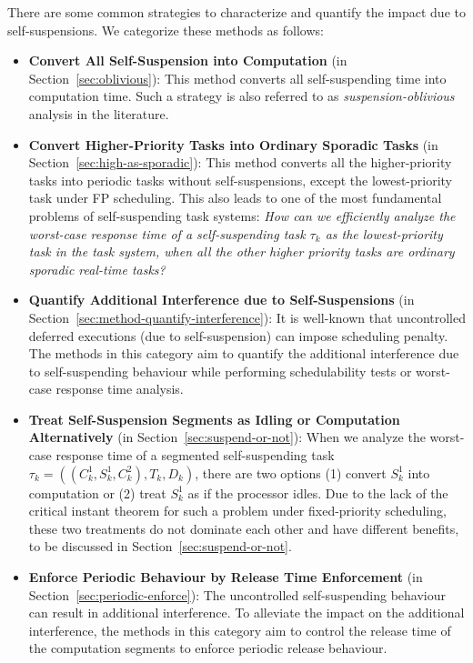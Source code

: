 \begin{table}[t]
\begin{table}[t]
There are some common strategies to characterize and quantify the impact due to self-suspensions. We categorize these methods as follows:
\begin{itemize}
\item \textbf{Convert All Self-Suspension into Computation} (in
  Section~\ref{sec:oblivious}): This method converts all self-suspending time
  into computation time. Such a strategy is also referred to as
  \emph{suspension-oblivious} analysis in the literature.
\item \textbf{Convert Higher-Priority Tasks into Ordinary Sporadic Tasks} (in
  Section~\ref{sec:high-as-sporadic}): This method converts all the
  higher-priority tasks into periodic tasks without self-suspensions,
  except the lowest-priority task under FP scheduling. This also leads
  to one of the most fundamental problems of self-suspending task
  systems: \emph{How can we efficiently analyze the worst-case response time
  of a self-suspending task $\tau_k$ as the lowest-priority task in
  the task system, when all the other higher priority tasks are
  ordinary sporadic real-time tasks?}
\item \textbf{Quantify Additional Interference due to
    Self-Suspensions} (in
  Section~\ref{sec:method-quantify-interference}): It is well-known
  that uncontrolled deferred executions (due to self-suspension) can
  impose scheduling penalty. The methods in this category aim to
  quantify the additional interference due to self-suspending
  behaviour while performing schedulability tests or worst-case
  response time analysis.

\item \textbf{Treat Self-Suspension Segments as Idling or Computation
    Alternatively} (in Section~\ref{sec:suspend-or-not}): When we
  analyze the worst-case response time of a segmented self-suspending
  task $\tau_k = ((C_k^1, S_k^1, C_k^2), T_k, D_k)$, there are two
  options (1) convert $S_k^1$ into computation or (2) treat $S_k^1$ as
  if the processor idles. Due to the lack of the critical instant
  theorem for such a problem under fixed-priority scheduling, these two treatments
  do not dominate each other and have different benefits, to be
  discussed in Section~\ref{sec:suspend-or-not}.

\item \textbf{Enforce Periodic Behaviour by Release Time Enforcement} (in
  Section~\ref{sec:periodic-enforce}): The uncontrolled
  self-suspending behaviour can result in additional interference.  To
  alleviate the impact on the additional interference, the methods in
  this category aim to control the release time of the computation
  segments to enforce periodic release behaviour.
\end{itemize}


\end{table}
\end{table}
